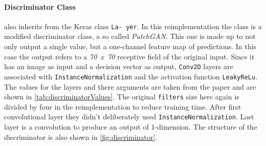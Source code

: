 \documentclass[fleqn,10pt]{SelfArx} %
\begin{document}
\paragraph{Discriminator Class} also inherits from the Keras class \texttt{La- yer}. In this reimplementation the class is a modified discriminator class, a so called \textit{Patch\ac{GAN}}. This one is made up to not only output a single value, but a one-channel feature map of predictions. In this case the output refers to a \textit{70~x~70} receptive field of the original input. Since it has an image as input and a decision vector as output, \texttt{Conv2D} layers are associated with \texttt{InstanceNormalization} and the activation function \texttt{LeakyReLu}. The values for the layers and there arguments are taken from the paper and are shown in \autoref{tab:discriminatorValues}. The original \texttt{filters} size here again is divided by four in the reimplementation to reduce training time. After first convolutional layer they didn't deliberately used \texttt{InstanceNormalization}. Last layer is a convolution to produce an output of 1-dimension. The structure of the discriminator is also shown in \autoref{fig:discriminator}. \cite{Introduction-to-Cycle-GANs}
\end{document}
